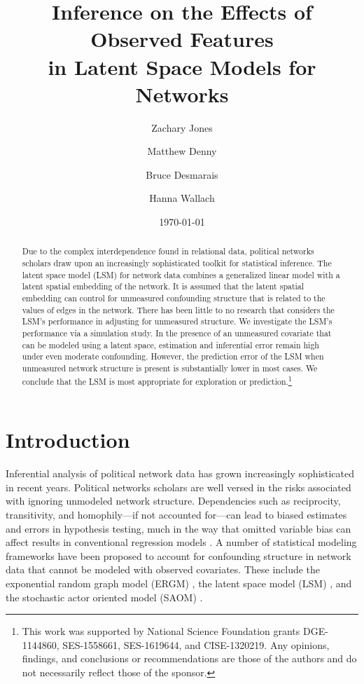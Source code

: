 \documentclass[11pt]{article}
\title{\vspace{-2cm} Inference on the Effects of Observed Features 
\\ in Latent Space Models for Networks }
\author{ Zachary Jones \and Matthew Denny \and Bruce Desmarais \and Hanna Wallach} \date{\today}
\begin{document}
\maketitle




\begin{abstract}

\noindent Due to the complex interdependence found in relational data, political networks scholars draw upon an increasingly sophisticated toolkit for statistical inference. The latent space model (LSM) for network data combines a generalized linear model with a latent spatial embedding of the network. It is assumed that the latent spatial embedding can control for unmeasured confounding structure that is related to the values of edges in the network. There has been little to no research that considers the LSM's performance in adjusting for unmeasured structure. We investigate the LSM's performance via a simulation study. In the presence of an unmeasured covariate that can be modeled using a latent space, estimation and inferential error remain high under even moderate confounding. However, the prediction error of the LSM when unmeasured network structure is present is substantially lower in most cases. We conclude that the LSM is most appropriate for exploration or prediction.\footnote{This work was supported by National Science Foundation grants DGE-1144860, SES-1558661, SES-1619644, and CISE-1320219. Any opinions, findings, and conclusions or recommendations are those of the authors and do not necessarily reflect those of the sponsor.}

\end{abstract}
\thispagestyle{empty}
\section{Introduction}

Inferential analysis of political network data has grown increasingly sophisticated in recent years. Political networks scholars are well versed in the risks associated with ignoring unmodeled network structure. Dependencies such as reciprocity, transitivity, and homophily---if not accounted for---can lead to biased estimates and errors in hypothesis testing, much in the way that omitted variable bias can affect results in conventional regression models \citep{ward2007disputes,kinne2014,cranmerisq}. A number of statistical modeling frameworks have been proposed to account for confounding structure in network data that cannot be modeled with observed covariates. These include the exponential random graph model (ERGM) \citep[e.g., ][]{lazer2010,cranmer2011pa,desmarais2012psj}, the latent space model (LSM) \citep[e.g., ][]{ward2007disputes,ward2007persistent,kirkland2012multimember}, and the stochastic actor oriented model (SAOM) \citep[e.g., ][]{berardo2010ajps,kinne2014}. 
\end{document}
